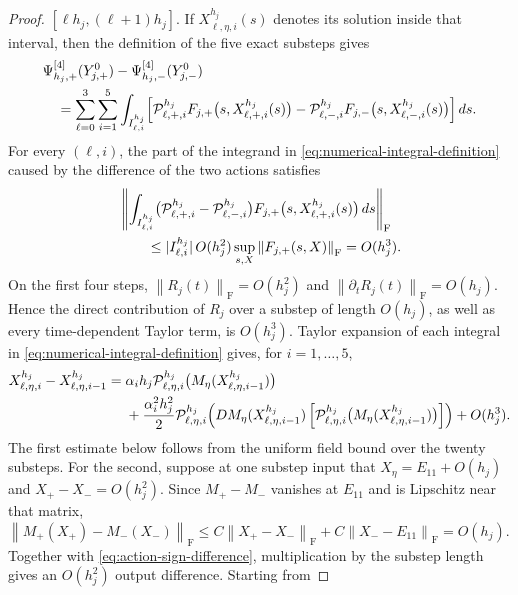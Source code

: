 \documentclass[]{article}
\numberwithin{equation}{section}
\theoremstyle{plain}
\theoremstyle{remark}
\newcommand{\F}{\mathrm F}
\newcommand{\norm}[1]{\left\lVert #1\right\rVert}
\begin{document}
\begin{proof}
$[\ell h_j,(\ell+1)h_j]$.  If $X^{h_j}_{\ell,\eta,i}(s)$ denotes its solution
inside that interval, then the definition of the five exact substeps gives
\begin{align}
 &\Psi^{[4]}_{h_j,+}(Y_{j,+}^0)-\Psi^{[4]}_{h_j,-}(Y_{j,-}^0)\notag\\
 &\quad=\sum_{\ell=0}^3\sum_{i=1}^5
 \int_{I^{h_j}_{\ell,i}}
 \Bigl[
 \mathcal P^{h_j}_{\ell,+,i}
 F_{j,+}\bigl(s,X^{h_j}_{\ell,+,i}(s)\bigr)
 -\mathcal P^{h_j}_{\ell,-,i}
 F_{j,-}\bigl(s,X^{h_j}_{\ell,-,i}(s)\bigr)
 \Bigr]\,ds.
 \label{eq:numerical-integral-definition}
\end{align}
For every $(\ell,i)$, the part of the integrand in
\eqref{eq:numerical-integral-definition} caused by the difference of
the two actions satisfies
\begin{align}
 &\norm{\int_{I^{h_j}_{\ell,i}}
 \bigl(\mathcal P^{h_j}_{\ell,+,i}
       -\mathcal P^{h_j}_{\ell,-,i}\bigr)
 F_{j,+}\bigl(s,X^{h_j}_{\ell,+,i}(s)\bigr)\,ds}_{\F}
 \notag\\
 &\qquad\le |I^{h_j}_{\ell,i}|\,
 O(h_j^2)\sup_{s,X}\norm{F_{j,+}(s,X)}_{\F}
 =O(h_j^3).
 \label{eq:projector-difference-order}
\end{align}
On the first four steps, $\norm{R_j(t)}_{\F}=O(h_j^2)$ and
$\norm{\partial_tR_j(t)}_{\F}=O(h_j)$.
Hence the direct contribution of $R_j$ over a substep of length
$O(h_j)$, as well as every time-dependent Taylor term, is $O(h_j^3)$.
Taylor expansion of each integral in
\eqref{eq:numerical-integral-definition} gives, for $i=1,\ldots,5$,
\begin{align}
 X^{h_j}_{\ell,\eta,i}-X^{h_j}_{\ell,\eta,i-1}
 ={}&\alpha_i h_j\mathcal P^{h_j}_{\ell,\eta,i}
      \bigl(M_\eta(X^{h_j}_{\ell,\eta,i-1})\bigr)\notag\\
 &+\frac{\alpha_i^2h_j^2}{2}
 \mathcal P^{h_j}_{\ell,\eta,i}\!\left(
 DM_\eta(X^{h_j}_{\ell,\eta,i-1})\left[
 \mathcal P^{h_j}_{\ell,\eta,i}
 \bigl(M_\eta(X^{h_j}_{\ell,\eta,i-1})\bigr)
 \right]\right)
 +O(h_j^3).
 \label{eq:one-substep-taylor}
\end{align}
The first estimate below follows from the uniform field bound over the
twenty substeps.  For the second, suppose at one substep input that
$X_\eta=E_{11}+O(h_j)$ and $X_+-X_-=O(h_j^2)$.
Since $M_+-M_-$ vanishes at $E_{11}$ and is Lipschitz near that matrix,
$\norm{M_+(X_+)-M_-(X_-)}_{\F}
\le C\norm{X_+-X_-}_{\F}+C\norm{X_--E_{11}}_{\F}=O(h_j)$.
Together with \eqref{eq:action-sign-difference}, multiplication by the
substep length gives an $O(h_j^2)$ output difference.  Starting from

\end{proof}
\end{document}
